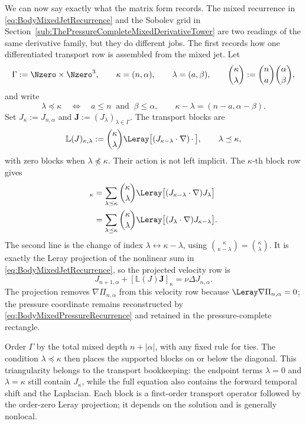 We can now say exactly what the matrix form records.
The mixed recurrence in \eqref{eq:BodyMixedJetRecurrence} and the Sobolev grid in Section~\ref{sub:ThePressureCompleteMixedDerivativeTower} are two readings of the same derivative family, but they do different jobs.
The first records how one differentiated transport row is assembled from the mixed jet.
Let
\[
  \Gamma:=\Nzero\times\Nzero^3,
  \qquad
  \kappa=(n,\alpha),
  \qquad
  \lambda=(a,\beta),
  \qquad
  \binom{\kappa}{\lambda}
  :=\binom{n}{a}\binom{\alpha}{\beta},
\]
and write
\[
  \lambda\preceq\kappa
  \quad\Longleftrightarrow\quad
  a\leq n\ \text{ and }\ \beta\leq\alpha,
  \qquad
  \kappa-\lambda=(n-a,\alpha-\beta).
\]
Set \(J_\kappa:=J_{n,\alpha}\) and
\(\mathbf J:=(J_\lambda)_{\lambda\in\Gamma}\).
The transport blocks are
\[
  \mathbb L(J)_{\kappa,\lambda}
  :=
  \binom{\kappa}{\lambda}
  \Leray\bigl[(J_{\kappa-\lambda}\cdot\nabla)\,\mathord\cdot\,\bigr],
  \qquad \lambda\preceq\kappa,
\]
with zero blocks when \(\lambda\npreceq\kappa\).
Their action is not left implicit.  The \(\kappa\)-th block row gives
\begin{align*}
  [\mathbb L(J)\mathbf J]_\kappa
  &=
  \sum_{\lambda\preceq\kappa}
  \binom{\kappa}{\lambda}
  \Leray\bigl[(J_{\kappa-\lambda}\cdot\nabla)J_\lambda\bigr]
  \\
  &=
  \sum_{\lambda\preceq\kappa}
  \binom{\kappa}{\lambda}
  \Leray\bigl[(J_\lambda\cdot\nabla)J_{\kappa-\lambda}\bigr].
\end{align*}
The second line is the change of index
\(\lambda\leftrightarrow\kappa-\lambda\), using
\(\binom{\kappa}{\kappa-\lambda}=\binom{\kappa}{\lambda}\).
It is exactly the Leray projection of the nonlinear sum in
\eqref{eq:BodyMixedJetRecurrence}, so the projected velocity row is
\[
  J_{n+1,\alpha}
  +[\mathbb L(J)\mathbf J]_\kappa
  =\nu\Delta J_{n,\alpha}.
\]
The projection removes \(\nabla\Pi_{n,\alpha}\) from this velocity row because
\(\Leray\nabla\Pi_{n,\alpha}=0\); the pressure coordinate remains reconstructed by
\eqref{eq:BodyMixedPressureRecurrence} and retained in the pressure-complete rectangle.

Order \(\Gamma\) by the total mixed depth \(n+|\alpha|\), with any fixed rule for ties.
The condition \(\lambda\preceq\kappa\) then places the supported blocks on or below the diagonal.
This triangularity belongs to the transport bookkeeping: the endpoint terms
\(\lambda=0\) and \(\lambda=\kappa\) still contain \(J_\kappa\), while the full equation also contains the forward temporal shift and the Laplacian.
Each block is a first-order transport operator followed by the order-zero Leray projection; it depends on the solution and is generally nonlocal.


